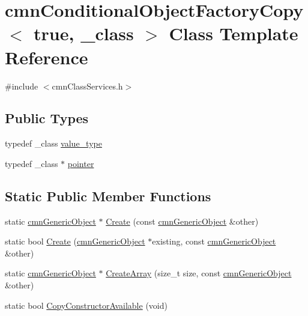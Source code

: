 \hypertarget{classcmn_conditional_object_factory_copy_3_01true_00_01__class_01_4}{}\section{cmn\+Conditional\+Object\+Factory\+Copy$<$ true, \+\_\+class $>$ Class Template Reference}
\label{classcmn_conditional_object_factory_copy_3_01true_00_01__class_01_4}


{\ttfamily \#include $<$cmn\+Class\+Services.\+h$>$}

\subsection*{Public Types}
\begin{DoxyCompactItemize}
\item 
typedef \+\_\+class \hyperlink{classcmn_conditional_object_factory_copy_3_01true_00_01__class_01_4_ad1492fd9e525d85f29807a26148f082e}{value\+\_\+type}
\item 
typedef \+\_\+class $\ast$ \hyperlink{classcmn_conditional_object_factory_copy_3_01true_00_01__class_01_4_af5fd377a8880cde0f6579e8e35a3d3ef}{pointer}
\end{DoxyCompactItemize}
\subsection*{Static Public Member Functions}
\begin{DoxyCompactItemize}
\item 
static \hyperlink{classcmn_generic_object}{cmn\+Generic\+Object} $\ast$ \hyperlink{classcmn_conditional_object_factory_copy_3_01true_00_01__class_01_4_a16e0c048ea5e29abdbb214bc575c4f4e}{Create} (const \hyperlink{classcmn_generic_object}{cmn\+Generic\+Object} \&other)
\item 
static bool \hyperlink{classcmn_conditional_object_factory_copy_3_01true_00_01__class_01_4_a88854dd733e90c4a67e242043957e84b}{Create} (\hyperlink{classcmn_generic_object}{cmn\+Generic\+Object} $\ast$existing, const \hyperlink{classcmn_generic_object}{cmn\+Generic\+Object} \&other)
\item 
static \hyperlink{classcmn_generic_object}{cmn\+Generic\+Object} $\ast$ \hyperlink{classcmn_conditional_object_factory_copy_3_01true_00_01__class_01_4_a919c8d5ca3b5d10a80c9e95d6e2ef12f}{Create\+Array} (size\+\_\+t size, const \hyperlink{classcmn_generic_object}{cmn\+Generic\+Object} \&other)
\item 
static bool \hyperlink{classcmn_conditional_object_factory_copy_3_01true_00_01__class_01_4_a38e1bcf7aa8f422a4d1b2128494dbe61}{Copy\+Constructor\+Available} (void)
\end{DoxyCompactItemize}


